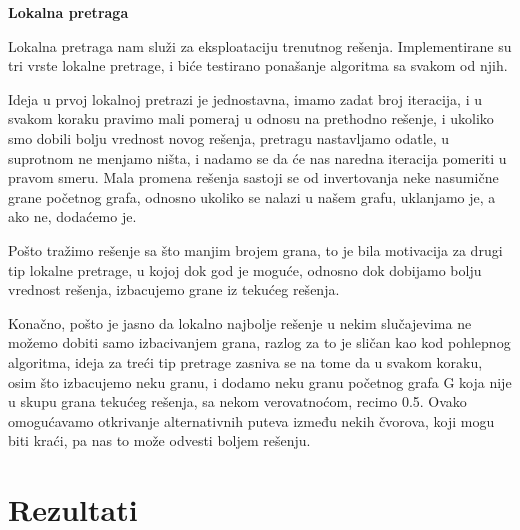 \documentclass{article}
\begin{document}
\textbf{Lokalna pretraga}
\newline

Lokalna pretraga nam služi za eksploataciju trenutnog rešenja. Implementirane su tri vrste lokalne pretrage, i biće testirano ponašanje algoritma sa svakom od njih.
\newline
\newline

Ideja u prvoj lokalnoj pretrazi je jednostavna, imamo zadat broj iteracija, i u svakom koraku pravimo mali pomeraj u odnosu na prethodno rešenje, i ukoliko smo dobili bolju vrednost novog rešenja, pretragu nastavljamo odatle, u suprotnom ne menjamo ništa, i nadamo se da će nas naredna iteracija pomeriti u pravom smeru. Mala promena rešenja sastoji se od invertovanja neke nasumične grane početnog grafa, odnosno ukoliko se nalazi u našem grafu, uklanjamo je, a ako ne, dodaćemo je.
\newline
\newline

Pošto tražimo rešenje sa što manjim brojem grana, to je bila motivacija za drugi tip lokalne pretrage, u kojoj dok god je moguće, odnosno dok dobijamo bolju vrednost rešenja, izbacujemo grane iz tekućeg rešenja.
\newline
\newline

Konačno, pošto je jasno da lokalno najbolje rešenje u nekim slučajevima ne možemo dobiti samo izbacivanjem grana, razlog za to je sličan kao kod pohlepnog algoritma, ideja za treći tip pretrage zasniva se na tome da u svakom koraku, osim što izbacujemo neku granu, i dodamo neku granu početnog grafa G koja nije u skupu grana tekućeg rešenja, sa nekom verovatnoćom, recimo 0.5. Ovako omogućavamo otkrivanje alternativnih puteva između nekih čvorova, koji mogu biti kraći, pa nas to može odvesti boljem rešenju.

\newpage

\section{\huge Rezultati}\label{sec:rez}
\end{document}
